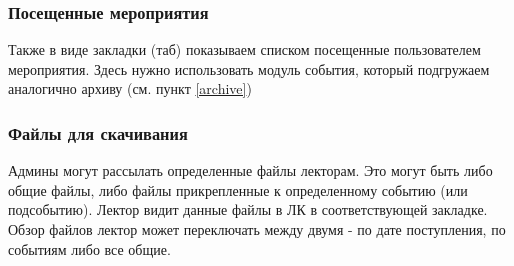 \documentclass[DIV=calc, paper=a4, fontsize=11pt]{scrartcl} %
\begin{document}
\subsubsection{Посещенные мероприятия}
Также в виде закладки (таб) показываем списком посещенные пользователем мероприятия. Здесь нужно использовать модуль события, который подгружаем аналогично архиву (см. пункт \ref{archive})

\subsubsection{Файлы для скачивания}
Админы могут рассылать определенные файлы лекторам. Это могут быть либо общие файлы, либо файлы прикрепленные к определенному событию (или подсобытию). Лектор видит данные файлы в ЛК в соответствующей закладке. Обзор файлов лектор может переключать между двумя - по дате поступления, по событиям либо все общие.
\end{document}
